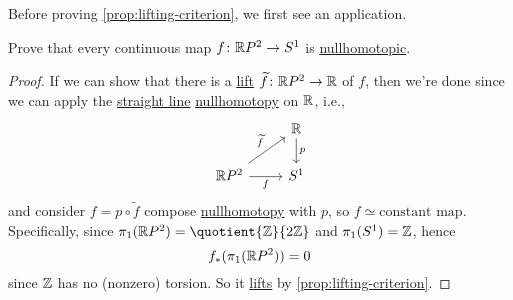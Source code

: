Before proving \autoref{prop:lifting-criterion}, we first see an application.
\begin{eg}
	Prove that every continuous map \(f\colon \mathbb{\MakeUppercase{r}} P^{2}\to S^1\) is \hyperref[def:nullhomotopic]{nullhomotopic}.
	\begin{proof}
		If we can show that there is a \hyperref[prop:homotopy-lifting-property]{lift} \(\widetilde{f} \colon \mathbb{\MakeUppercase{r}} P^{2}\to \mathbb{\MakeUppercase{r}}\) of \(f\),
		then we're done since we can apply the \hyperref[eg:lec1:straight-line-homotopy]{straight line} \hyperref[def:nullhomotopic]{nullhomotopy}
		on \(\mathbb{\MakeUppercase{r}} \), i.e.,
		\[\begin{tikzcd}
				& {\mathbb{R}} \\
				{\mathbb{R}P^2} & {S^1}
				\arrow["f"', from=2-1, to=2-2]
				\arrow["{\widetilde{f}}", from=2-1, to=1-2]
				\arrow["p", from=1-2, to=2-2]
			\end{tikzcd}\]
		and consider \(f = p \circ \widetilde{f} \) compose \hyperref[def:nullhomotopic]{nullhomotopy} with \(p\), so \(f\simeq \text{constant map} \).
		Specifically, since \(\pi _1(\mathbb{\MakeUppercase{r}} P^{2}) = \quotient{\mathbb{\MakeUppercase{z}}}{2 \mathbb{\MakeUppercase{z}}}\) and
		\(\pi _1(S^1) = \mathbb{\MakeUppercase{z}} \), hence
		\[
			f_\ast (\pi _1(\mathbb{\MakeUppercase{r}} P^{2} )) = 0
		\]
		since \(\mathbb{\MakeUppercase{z}} \) has no (nonzero) torsion. So it \hyperref[prop:homotopy-lifting-property]{lifts} by
		\autoref{prop:lifting-criterion}.
	\end{proof}
\end{eg}

